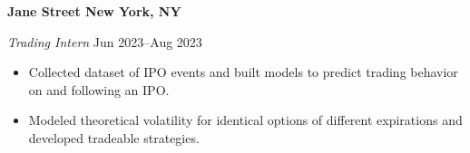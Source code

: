 \textbf{Jane Street \hfill New York, NY}\par

\textit{Trading Intern} \hfill Jun 2023--Aug 2023
\begin{itemize}
	\item Collected dataset of IPO events and built models to predict trading behavior on and following an IPO.
	\item Modeled theoretical volatility for identical options of different expirations and developed tradeable strategies.
\end{itemize}